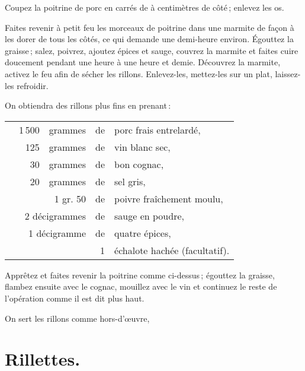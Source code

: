 Coupez la poitrine de porc en carrés de {\mmm} à {\mmm} centimètres
de côté ; enlevez les os.

Faites revenir à petit feu les morceaux de poitrine dans une marmite de façon
à les dorer de tous les côtés, ce qui demande une demi-heure environ. Égouttez
la graisse ; salez, poivrez, ajoutez épices et sauge, couvrez la marmite et
faites cuire doucement pendant une heure à une heure et demie. Découvrez la
marmite, activez le feu afin de sécher les rillons. Enlevez-les, mettez-les sur
un plat, laissez-les refroidir.

\sk

On obtiendra des rillons plus fins en prenant :

\medskip

\footnotesize
\begin{longtable}{rrrrp{16em}}
 &  1 500 & grammes & de & porc frais entrelardé,                                                         \\
 &    125 & grammes & de & vin blanc sec,                                                                 \\
 &     30 & grammes & de & bon cognac,                                                                    \\
 &     20 & grammes & de & sel gris,                                                                      \\
 &      & 1 gr. 50  & de & poivre fraîchement moulu,                                                      \\
 &  \multicolumn{2}{r}{2 décigrammes} & de & sauge en poudre,                                             \\
 &  \multicolumn{2}{r}{1 décigramme}  & de & quatre épices,                                               \\
 &       &         &  1 & échalote hachée (facultatif).                                                   \\
\end{longtable}
\normalsize

Apprêtez et faites revenir la poitrine comme ci-dessus ; égouttez la graisse,
flambez ensuite avec le cognac, mouillez avec le vin et continuez le reste de
l'opération comme il est dit plus haut.

\sk

On sert les rillons comme hors-d'œuvre,

\section*{\centering Rillettes.}
{}

